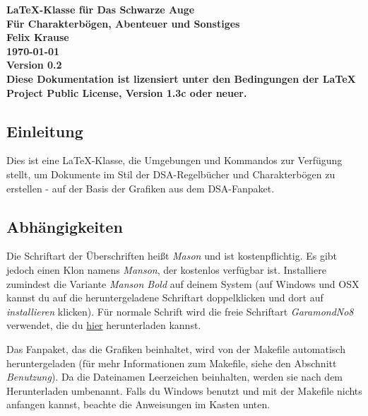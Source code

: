 \documentclass{dsa}
\begin{document}
   \begin{dsaTitlePage}
      \bfseries \Huge \LaTeX-Klasse für Das Schwarze Auge \\[15pt]
      \LARGE Für Charakterbögen, Abenteuer und Sonstiges \\[40pt]
      {\large \normalfont Felix Krause \\[10pt] \today \\[10pt] Version 0.2} \\[15pt]
      {\small \normalfont Diese Dokumentation ist lizensiert unter den Bedingungen der
       LaTeX Project Public License, Version 1.3c oder neuer.}
   \end{dsaTitlePage}
      
   
   \subsection*{Einleitung}
   
   Dies ist eine \LaTeX-Klasse, die Umgebungen und Kommandos zur Verfügung
   stellt, um Dokumente im Stil der DSA-Regelbücher und Charakterbögen zu 
   erstellen - auf der Basis der Grafiken aus dem DSA-Fanpaket.
   
   \subsection*{Abhängigkeiten}
   
   Die Schriftart der Überschriften heißt \textit{Mason} und ist
   kostenpflichtig. Es gibt jedoch einen Klon namens \textit{Manson}, der
   kostenlos verfügbar ist. Installiere zumindest die Variante
   \textit{Manson Bold} auf deinem System (auf Windows und OSX kannst du auf
   die heruntergeladene Schriftart doppelklicken und dort auf
   \textit{installieren} klicken). Für normale Schrift wird die freie Schriftart
   \textit{GaramondNo8} verwendet, die du \href{http://garamond.org}{hier}
   herunterladen kannst.
   
   Das Fanpaket, das die Grafiken beinhaltet, wird von der Makefile automatisch
   heruntergeladen (für mehr Informationen zum Makefile, siehe den Abschnitt
   \textit{Benutzung}). Da die Dateinamen Leerzeichen beinhalten, werden sie
   nach dem Herunterladen umbenannt. Falls du Windows benutzt und mit der
   Makefile nichts anfangen kannst, beachte die Anweisungen im Kasten unten.
   
\end{document}
